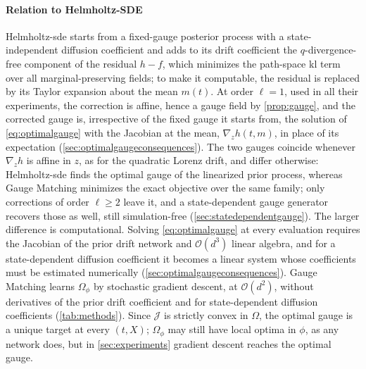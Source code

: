 \documentclass{article} %
\newcommand{\priordrift}{h}
\newcommand{\postdrift}{f}
\newcommand{\obs}{X}
\newcommand{\gauge}{\Omega}
\begin{document}
\paragraph{Relation to Helmholtz-SDE}
Helmholtz-\gls{sde} \citep{smith2026closing} starts from a fixed-gauge posterior process with a state-independent diffusion coefficient and adds to its drift coefficient the $q$-divergence-free component of the residual $\priordrift - \postdrift$, which minimizes the path-space \gls{kl} term over all marginal-preserving fields; to make it computable, the residual is replaced by its Taylor expansion about the mean $m(t)$. At order $\ell = 1$, used in all their experiments, the correction is affine, hence a gauge field by \cref{prop:gauge}, and the corrected gauge is, irrespective of the fixed gauge it starts from, the solution of \cref{eq:optimalgauge} with the Jacobian at the mean, $\nabla_z \priordrift(t, m)$, in place of its expectation (\cref{sec:optimalgaugeconsequences}). The two gauges coincide whenever $\nabla_z \priordrift$ is affine in $z$, as for the quadratic Lorenz drift, and differ otherwise: Helmholtz-\gls{sde} finds the optimal gauge of the linearized prior process, whereas Gauge Matching minimizes the exact objective over the same family; only corrections of order $\ell \ge 2$ leave it, and a state-dependent gauge generator recovers those as well, still simulation-free (\cref{sec:statedependentgauge}). The larger difference is computational. Solving \cref{eq:optimalgauge} at every evaluation requires the Jacobian of the prior drift network and $\mathcal{O}(d^3)$ linear algebra, and for a state-dependent diffusion coefficient it becomes a linear system whose coefficients must be estimated numerically (\cref{sec:optimalgaugeconsequences}). Gauge Matching learns $\gauge_\phi$ by stochastic gradient descent, at $\mathcal{O}(d^2)$, without derivatives of the prior drift coefficient and for state-dependent diffusion coefficients (\cref{tab:methods}). Since $\mathcal{J}$ is strictly convex in $\gauge$, the optimal gauge is a unique target at every $(t, \obs)$; $\gauge_\phi$ may still have local optima in $\phi$, as any network does, but in \cref{sec:experiments} gradient descent reaches the optimal gauge.
\end{document}

